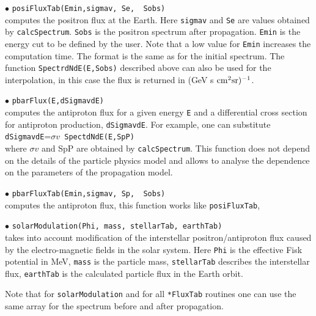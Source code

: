 \documentclass[12pt,a4paper]{article}
\begin{document}
\noindent  
$\bullet$ \verb|posiFluxTab(Emin,sigmav, Se,  Sobs)|\\
computes the positron flux at the Earth. Here \verb|sigmav| and \verb|Se| are values obtained by 
\verb|calcSpectrum|.  \verb|Sobs| is the positron spectrum after propagation. \verb|Emin| is the energy cut to be defined by the user. Note that
a low value for \verb|Emin| increases the computation time.
The  format is the same as for the initial spectrum. The function  
\verb|SpectrdNdE(E,Sobs)| described above can also be used for the interpolation, in this case the flux is
returned in (GeV s ${\rm cm}^2 {\rm sr})^{-1}$. 

\noindent
$\bullet$ \verb|pbarFlux(E,dSigmavdE)|\\
computes the antiproton flux for a given energy {\tt E} and a 
differential cross section for antiproton production, {\tt dSigmavdE}.
For example, one can substitute\\ {\tt dSigmavdE}=$\sigma v${\tt
SpectdNdE(E,SpP)} \\
where $ \sigma v$ and {SpP} are obtained by {\tt calcSpectrum}.
This function does not depend on the details of the particle physics  model and allows to analyse the dependence on the
parameters of the propagation model.

\noindent
$\bullet$ \verb|pbarFluxTab(Emin,sigmav, Sp,  Sobs)|\\
computes the antiproton flux, this function works like \verb|posiFluxTab|,

\noindent
$\bullet$ \verb|solarModulation(Phi, mass, stellarTab, earthTab)|\\
takes into account modification of the interstellar positron/antiproton flux 
caused by the electro-magnetic fields in the solar system. Here \verb|Phi| is the
effective Fisk potential in MeV, \verb|mass| is the particle mass,
\verb|stellarTab| describes the interstellar flux, \verb|earthTab| 
is the calculated particle flux in the Earth orbit.

Note that for \verb|solarModulation| and for  all \verb|*FluxTab| 
routines one can use  the same array for the spectrum before and after propagation. 
\end{document}
